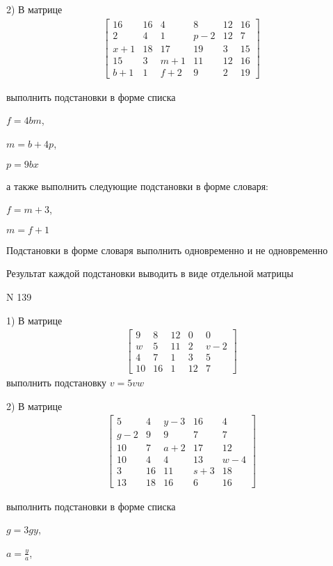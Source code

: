 \documentclass[11pt]{report}
\begin{document}
    2) В матрице
\begin{align*}
\left[\begin{matrix}16 & 16 & 4 & 8 & 12 & 16\\2 & 4 & 1 & p - 2 & 12 & 7\\x + 1 & 18 & 17 & 19 & 3 & 15\\15 & 3 & m + 1 & 11 & 12 & 16\\b + 1 & 1 & f + 2 & 9 & 2 & 19\end{matrix}\right]
\end{align*}

выполнить подстановки в форме списка

$f=4 b m$,

$m=b + 4 p$,

$p=9 b x$

а также выполнить следующие подстановки в форме словаря:

$f=m + 3$,

$m=f + 1$


    Подстановки в форме словаря выполнить одновременно и не одновременно


    Результат каждой подстановки выводить в виде отдельной матрицы

\newpage
N 139


    1) В матрице
\begin{align*}
\left[\begin{matrix}9 & 8 & 12 & 0 & 0\\w & 5 & 11 & 2 & v - 2\\4 & 7 & 1 & 3 & 5\\10 & 16 & 1 & 12 & 7\end{matrix}\right]
\end{align*}
выполнить подстановку $v=5 v w$


    2) В матрице
\begin{align*}
\left[\begin{matrix}5 & 4 & y - 3 & 16 & 4\\g - 2 & 9 & 9 & 7 & 7\\10 & 7 & a + 2 & 17 & 12\\10 & 4 & 4 & 13 & w - 4\\3 & 16 & 11 & s + 3 & 18\\13 & 18 & 16 & 6 & 16\end{matrix}\right]
\end{align*}

выполнить подстановки в форме списка

$g=3 g y$,

$a=\frac{y}{a}$,
\end{document}
